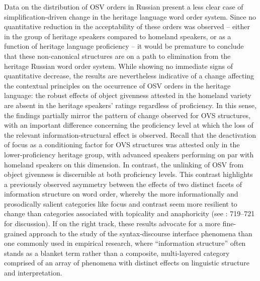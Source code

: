 \documentclass[output=paper]{langscibook}
\begin{document}
Data on the distribution of OSV orders in Russian present a less clear case of simplification-driven change in the heritage language word order system. Since no quantitative reduction in the acceptability of these orders was observed – either in the group of heritage speakers compared to homeland speakers, or as a function of heritage language proficiency – it would be premature to conclude that these non-canonical structures are on a path to elimination from the heritage Russian word order system. While showing no immediate signs of quantitative decrease, the results are nevertheless indicative of a change affecting the contextual principles on the occurrence of OSV orders in the heritage language: the robust effects of object givenness attested in the homeland variety are absent in the heritage speakers’ ratings regardless of proficiency. In this sense, the findings partially mirror the pattern of change observed for OVS structures, with an important difference concerning the proficiency level at which the loss of the relevant information-structural effect is observed. Recall that the deactivation of focus as a conditioning factor for OVS structures was attested only in the lower-proficiency heritage group, with advanced speakers performing on par with homeland speakers on this dimension. In contrast, the unlinking of OSV from object givenness is discernible at both proficiency levels. This contrast highlights a previously observed asymmetry between the effects of two distinct facets of information structure on word order, whereby the more informationally and prosodically salient categories like focus and contrast seem more resilient to change than categories associated with topicality and anaphoricity (see \citealt{Laleko2021}: 719--721 for discussion). If on the right track, these results advocate for a more fine-grained approach to the study of the syntax-discourse interface phenomena than one commonly used in empirical research, where “information structure” often stands as a blanket term rather than a composite, multi-layered category comprised of an array of phenomena with distinct effects on linguistic structure and interpretation.
\end{document}
